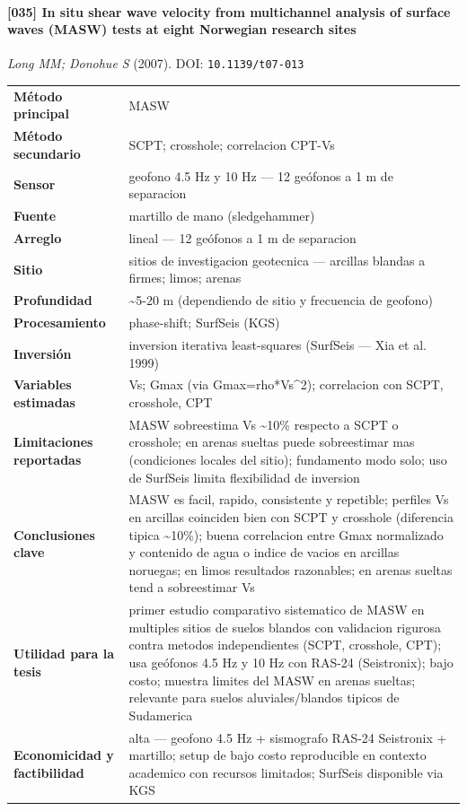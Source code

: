 \paragraph{[035] In situ shear wave velocity from multichannel analysis of surface waves (MASW) tests at eight Norwegian research sites} \emph{Long MM; Donohue S} (2007).
{\scriptsize DOI: \texttt{10.1139/t07-013}}

\begin{center}\scriptsize
\begin{tabularx}{\textwidth}{@{}>{\bfseries}p{3.3cm} X@{}}
\toprule
M\'etodo principal & MASW \\
M\'etodo secundario & SCPT; crosshole; correlacion CPT-Vs \\
Sensor & geofono 4.5 Hz y 10 Hz --- 12 geófonos a 1 m de separacion \\
Fuente & martillo de mano (sledgehammer) \\
Arreglo & lineal --- 12 geófonos a 1 m de separacion \\
Sitio & sitios de investigacion geotecnica --- arcillas blandas a firmes; limos; arenas \\
Profundidad & \textasciitilde{}5-20 m (dependiendo de sitio y frecuencia de geofono) \\
Procesamiento & phase-shift; SurfSeis (KGS) \\
Inversi\'on & inversion iterativa least-squares (SurfSeis --- Xia et al. 1999) \\
Variables estimadas & Vs; Gmax (via Gmax=rho*Vs\textasciicircum{}2); correlacion con SCPT, crosshole, CPT \\
Limitaciones reportadas & MASW sobreestima Vs \textasciitilde{}10\% respecto a SCPT o crosshole; en arenas sueltas puede sobreestimar mas (condiciones locales del sitio); fundamento modo solo; uso de SurfSeis limita flexibilidad de inversion \\
Conclusiones clave & MASW es facil, rapido, consistente y repetible; perfiles Vs en arcillas coinciden bien con SCPT y crosshole (diferencia tipica \textasciitilde{}10\%); buena correlacion entre Gmax normalizado y contenido de agua o indice de vacios en arcillas noruegas; en limos resultados razonables; en arenas sueltas tend a sobreestimar Vs \\
Utilidad para la tesis & primer estudio comparativo sistematico de MASW en multiples sitios de suelos blandos con validacion rigurosa contra metodos independientes (SCPT, crosshole, CPT); usa geófonos 4.5 Hz y 10 Hz con RAS-24 (Seistronix); bajo costo; muestra limites del MASW en arenas sueltas; relevante para suelos aluviales/blandos tipicos de Sudamerica \\
Economicidad y factibilidad & alta --- geofono 4.5 Hz + sismografo RAS-24 Seistronix + martillo; setup de bajo costo reproducible en contexto academico con recursos limitados; SurfSeis disponible via KGS \\
\bottomrule
\end{tabularx}
\end{center}

